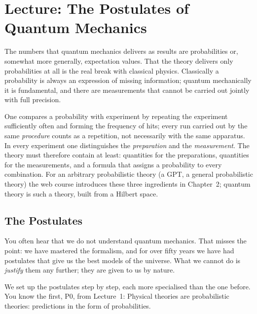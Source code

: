 \section{Lecture: The Postulates of Quantum Mechanics}
The numbers that quantum mechanics delivers as results are probabilities or, somewhat more generally, expectation values. That the theory delivers only probabilities at all is the real break with classical physics. Classically a probability is always an expression of missing information; quantum mechanically it is fundamental, and there are measurements that cannot be carried out jointly with full precision.

One compares a probability with experiment by repeating the experiment sufficiently often and forming the frequency of hits; every run carried out by the same \emph{procedure} counts as a repetition, not necessarily with the same apparatus. In every experiment one distinguishes the \emph{preparation} and the \emph{measurement}. The theory must therefore contain at least: quantities for the preparations, quantities for the measurements, and a formula that assigns a probability to every combination. For an arbitrary probabilistic theory (a GPT, a general probabilistic theory) the web course introduces these three ingredients in Chapter~2; quantum theory is such a theory, built from a Hilbert space.

\subsection{The Postulates}

\begin{greybox}
You often hear that we do not understand quantum mechanics. That misses the point: we have mastered the formalism, and for over fifty years we have had postulates that give us the best models of the universe. What we cannot do is \emph{justify} them any further; they are given to us by nature.
\end{greybox}

We set up the postulates step by step, each more specialised than the one before. You know the first, P0, from Lecture~1: Physical theories are probabilistic theories: predictions in the form of probabilities.

